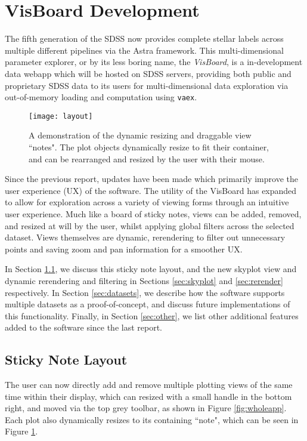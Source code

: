 \documentclass[a4paper,10pt,twocolumn]{article}
\begin{document}
\section{VisBoard Development}
The fifth generation of the SDSS now provides complete stellar labels across multiple different pipelines via the Astra framework. This multi-dimensional parameter explorer, or by its less boring name, the \emph{VisBoard}, is a in-development data webapp which will be hosted on SDSS servers, providing both public and proprietary SDSS data to its users for multi-dimensional data exploration via out-of-memory loading and computation using \texttt{vaex}.
\begin{figure}[tp]
	\centering
	\texttt{[image: layout]}
	\caption{A demonstration of the dynamic resizing and draggable view ``notes". The plot objects dynamically resize to fit their container, and can be rearranged and resized by the user with their mouse.}
	\label{fig:layout}
\end{figure}

Since the previous report, updates have been made which primarily improve the user experience (UX) of the software. The utility of the VisBoard has expanded to allow for exploration across a variety of viewing forms through an intuitive user experience. Much like a board of sticky notes, views can be added, removed, and resized at will by the user, whilst applying global filters across the selected dataset. Views themselves are dynamic, rerendering to filter out unnecessary points and saving zoom and pan information for a smoother UX.

In Section \ref{sec:sticky}, we discuss this sticky note layout, and the new skyplot view and dynamic rerendering and filtering in Sections \ref{sec:skyplot} and \ref{sec:rerender} respectively. In Section \ref{sec:datasets}, we describe how the software supports multiple datasets as a proof-of-concept, and discuss future implementations of this functionality. Finally, in Section \ref{sec:other}, we list other additional features added to the software since the last report.

\subsection{Sticky Note Layout}
\label{sec:sticky}
The user can now directly add and remove multiple plotting views of the same time within their display, which can resized with a small handle in the bottom right, and moved via the top grey toolbar, as shown in Figure \ref{fig:wholeapp}. Each plot also dynamically resizes to its containing ``note", which can be seen in Figure \ref{fig:layout}.
\end{document}
